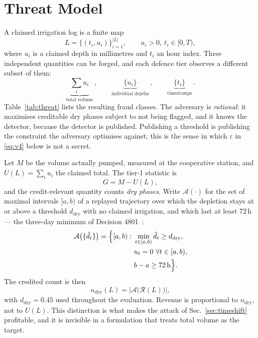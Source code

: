 \section{Threat Model}
\label{sec:threat}

A claimed irrigation log is a finite map
\begin{equation}
L=\{(t_i,u_i)\}_{i=1}^{|L|},\qquad u_i>0,\ t_i\in[0,T),
\label{eq:log}
\end{equation}
where $u_i$ is a claimed depth in millimetres and $t_i$ an hour index. Three
independent quantities can be forged, and each defence tier observes a different
subset of them:
\begin{equation}
\underbrace{\textstyle\sum_i u_i}_{\text{total volume}}\,,\qquad
\underbrace{\{u_i\}}_{\text{individual depths}}\,,\qquad
\underbrace{\{t_i\}}_{\text{timestamps}}\,.
\label{eq:three}
\end{equation}
Table~\ref{tab:threat} lists the resulting fraud classes. The adversary is
\emph{rational}: it maximises creditable dry phases subject to not being flagged,
and it knows the detector, because the detector is published. Publishing a
threshold is publishing the constraint the adversary optimises against; this is
the sense in which $\varepsilon$ in \eqref{eq:v4} below is not a secret.

Let $M$ be the volume actually pumped, measured at the cooperative station, and
$U(L)=\sum_i u_i$ the claimed total. The tier-1 statistic is
\begin{equation}
G=M-U(L),
\label{eq:gap}
\end{equation}
and the credit-relevant quantity counts \emph{dry phases}. Write
$\mathcal{A}(\cdot)$ for the set of maximal intervals $[a,b)$ of a replayed
trajectory over which the depletion stays at or above a threshold
$d_{\mathrm{dry}}$ with no claimed irrigation, and which last at least $72$\,h ---
the three-day minimum of Decision 4801~\cite{qd4801}:
\begin{equation}
\begin{aligned}
\mathcal{A}\bigl(\{\hat d_t\}\bigr)=\Bigl\{[a,b):\ &\min_{t\in[a,b)}
\hat d_t\ge d_{\mathrm{dry}},\\
&u_t=0\ \forall t\in[a,b),\\
&b-a\ge 72\,\mathrm{h}\Bigr\}.
\end{aligned}
\label{eq:awd}
\end{equation}
The credited count is then
\begin{equation}
n_{\mathrm{dry}}(L)=\bigl|\mathcal{A}\bigl(\mathcal{R}(L)\bigr)\bigr|,
\label{eq:ndry}
\end{equation}
with $d_{\mathrm{dry}}=0.45$ used throughout the evaluation.
Revenue is proportional to $n_{\mathrm{dry}}$, not to $U(L)$. This distinction is
what makes the attack of Sec.~\ref{sec:timeshift} profitable, and it is invisible
in a formulation that treats total volume as the target.

